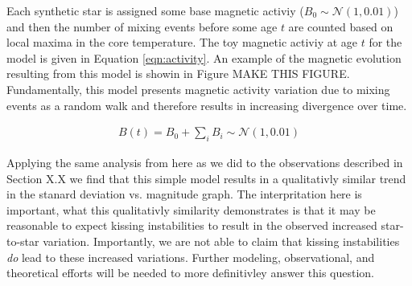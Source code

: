 Each synthetic star is assigned some base magnetic activiy ($B_{0} \sim
\mathcal{N}(1, 0.01)$) and then the number of mixing events before some age $t$
are counted based on local maxima in the core temperature. The toy magnetic
activiy at age $t$ for the model is given in Equation \ref{eqn:activity}. An
example of the magnetic evolution resulting from this model is showin in Figure
{\color{red} MAKE THIS FIGURE.} Fundamentally, this model presents magnetic
activity variation due to mixing events as a random walk and therefore results in
increasing divergence over time.

\begin{align}\label{eqn:activity}
  B(t) = B_{0} + \sum_{i}B_{i} \sim \mathcal{N}(1, 0.01) 
\end{align}

Applying the same analysis from here as we did to the observations described in
Section {\color{red} X.X} we find that this simple model results in a
qualitativly similar trend in the stanard deviation vs. magnitude graph. The
interpritation here is important, what this qualitativly similarity
demonstrates is that it may be reasonable to expect kissing instabilities to
result in the observed increased star-to-star variation. Importantly, we are
not able to claim that kissing instabilities \textit{do} lead to these
increased variations. Further modeling, observational, and theoretical efforts
will be needed to more definitivley answer this question.

